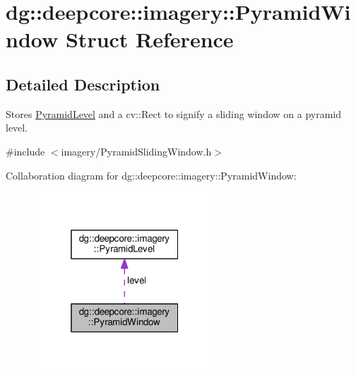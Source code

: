 \hypertarget{structdg_1_1deepcore_1_1imagery_1_1_pyramid_window}{}\section{dg\+:\+:deepcore\+:\+:imagery\+:\+:Pyramid\+Window Struct Reference}
\label{structdg_1_1deepcore_1_1imagery_1_1_pyramid_window}


\subsection{Detailed Description}
Stores \hyperlink{structdg_1_1deepcore_1_1imagery_1_1_pyramid_level}{Pyramid\+Level} and a cv\+::\+Rect to signify a sliding window on a pyramid level. 

{\ttfamily \#include $<$imagery/\+Pyramid\+Sliding\+Window.\+h$>$}



Collaboration diagram for dg\+:\+:deepcore\+:\+:imagery\+:\+:Pyramid\+Window\+:
\nopagebreak
\begin{figure}[H]
\begin{center}
\leavevmode
\includegraphics[width=193pt]{structdg_1_1deepcore_1_1imagery_1_1_pyramid_window__coll__graph}
\end{center}
\end{figure}
